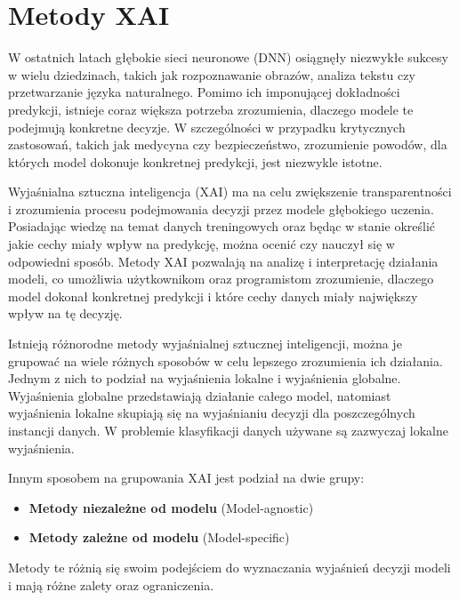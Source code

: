 
\section*{Metody XAI}
W ostatnich latach głębokie sieci neuronowe (DNN) osiągnęły niezwykłe sukcesy w wielu dziedzinach, takich jak rozpoznawanie obrazów, analiza tekstu czy przetwarzanie języka naturalnego.
Pomimo ich imponującej dokładności predykcji, istnieje coraz większa potrzeba zrozumienia, dlaczego modele te podejmują konkretne decyzje.
W szczególności w przypadku krytycznych zastosowań, takich jak medycyna czy bezpieczeństwo, zrozumienie powodów, dla których model dokonuje konkretnej predykcji, jest niezwykle istotne.

Wyjaśnialna sztuczna inteligencja (XAI)\cite{XAItax, XAIcurrent, XAIOnC, XAIcounter} ma na celu zwiększenie transparentności i zrozumienia procesu podejmowania decyzji przez modele głębokiego uczenia.
Posiadając wiedzę na temat danych treningowych oraz będąc w stanie określić jakie cechy miały wpływ na predykcję, można ocenić czy nauczył się w odpowiedni sposób.
Metody XAI pozwalają na analizę i interpretację działania modeli, co umożliwia użytkownikom oraz programistom zrozumienie, dlaczego model dokonał konkretnej predykcji i które cechy danych miały największy wpływ na tę decyzję.

Istnieją różnorodne metody wyjaśnialnej sztucznej inteligencji, można je grupować na wiele różnych sposobów w celu lepszego zrozumienia ich działania.
Jednym z nich to podział na wyjaśnienia lokalne\cite{ribeiro2016why} i wyjaśnienia globalne\cite{XAIglobal}.
Wyjaśnienia globalne przedstawiają działanie całego model, natomiast wyjaśnienia lokalne skupiają się na wyjaśnianiu decyzji dla poszczególnych instancji danych.
W problemie klasyfikacji danych używane są zazwyczaj lokalne wyjaśnienia.

Innym sposobem na grupowania XAI jest podział na dwie grupy:
\begin{itemize}
	\item \textbf{Metody niezależne od modelu} (Model-agnostic)
	\item \textbf{Metody zależne od modelu} (Model-specific)
\end{itemize}
Metody te różnią się swoim podejściem do wyznaczania wyjaśnień decyzji modeli i mają różne zalety oraz ograniczenia.

